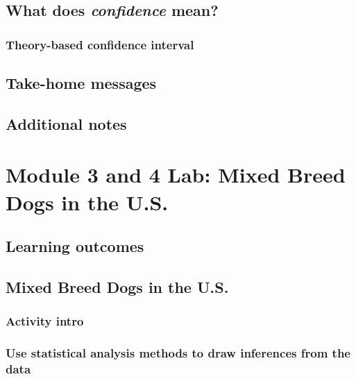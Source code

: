 \documentclass[
]{report}
\begin{document}
\subsection*{\texorpdfstring{What does \emph{confidence} mean?}{What does confidence mean?}}\label{what-does-confidence-mean}

\subsubsection*{Theory-based confidence interval}\label{theory-based-confidence-interval}

\subsection{Take-home messages}\label{take-home-messages-9}

\subsection{Additional notes}\label{additional-notes-9}

\section{Module 3 and 4 Lab: Mixed Breed Dogs in the U.S.}\label{module-3-and-4-lab-mixed-breed-dogs-in-the-u.s.}

\subsection{Learning outcomes}\label{learning-outcomes-10}

\subsection{Mixed Breed Dogs in the U.S.}\label{mixed-breed-dogs-in-the-u.s.}

\subsubsection*{Activity intro}\label{activity-intro-1}

\subsubsection*{Use statistical analysis methods to draw inferences from the data}\label{use-statistical-analysis-methods-to-draw-inferences-from-the-data-2}
\end{document}
